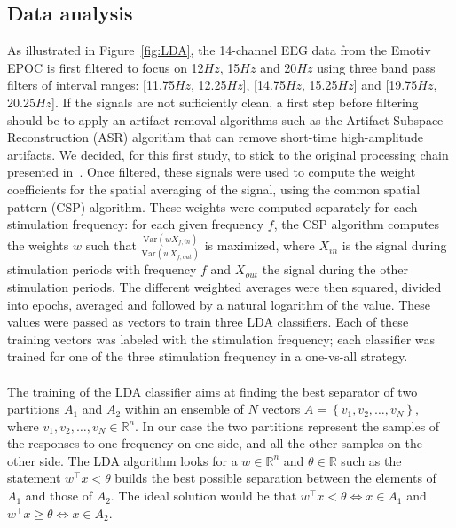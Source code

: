 \documentclass[smallextended]{svjour3}
\begin{document}
\subsection{Data analysis}
As illustrated in Figure~\ref{fig:LDA}, the 14-channel EEG data from the Emotiv EPOC is first filtered to focus on 12$Hz$, 15$Hz$ and 20$Hz$ using three band pass filters of interval ranges: [11.75$Hz$, 12.25$Hz$], [14.75$Hz$, 15.25$Hz$] and [19.75$Hz$, 20.25$Hz$]. 
If the signals are not sufficiently clean, a first step before filtering should be to apply an artifact removal algorithms such as the Artifact Subspace Reconstruction (ASR) algorithm that can remove short-time high-amplitude artifacts. We decided, for this first study, to stick to the original processing chain presented in~\cite{openvibeSSVEP}.
Once filtered, these signals were used to compute the weight coefficients for the spatial averaging of the signal, using the common spatial pattern (CSP) algorithm. These weights were computed separately for each stimulation frequency: for each given frequency $f$, the CSP algorithm computes the weights $w$ such that $\frac{\textrm{Var}(w X_{f,in})}{\textrm{Var}(w X_{f,out})}$ is maximized, where $X_{in}$ is the signal during stimulation periods with frequency $f$ and $X_{out}$ the signal during the other stimulation periods. 
The different weighted averages were then squared, divided into epochs, averaged and followed by a natural logarithm of the value. These values were passed as vectors to train three LDA classifiers. 
Each of these training vectors was labeled with the stimulation frequency; each classifier was trained for one of the three stimulation frequency in a one-vs-all strategy. \\
\\
The training of the LDA classifier aims at finding the best separator of two partitions $A_1$ and $A_2$ within an ensemble of $N$ vectors $A = \left\{v_1, v_2, \hdots, v_N\right\}$, where $v_1, v_2, \hdots, v_N \in \mathbb R^n$. In our case the two partitions represent the samples of the responses to one frequency on one side, and all the other samples on the other side.
The LDA algorithm looks for a $w\in\mathbb R^n$ and $\theta\in\mathbb R$ such as the statement $w^\top x < \theta$ builds the best possible separation between the elements of $A_1$ and those of $A_2$. The ideal solution would be that $w^\top x < \theta \Leftrightarrow x\in A_1$ and $w^\top x \geq \theta \Leftrightarrow x\in A_2$.
\end{document}
